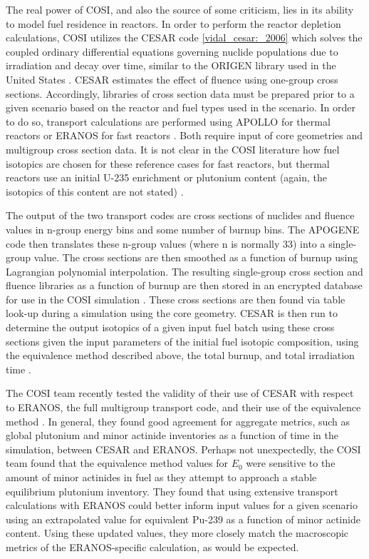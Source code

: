 The real power of COSI, and also the source of some criticism, lies in its
ability to model fuel residence in reactors. In order to perform the reactor
depletion calculations, COSI utilizes the CESAR code \ref{vidal_cesar:_2006}
which solves the coupled ordinary differential equations governing nuclide
populations due to irradiation and decay over time, similar to the ORIGEN
library used in the United States \cite{bell_origen_1973}. CESAR estimates the
effect of fluence using one-group cross sections. Accordingly, libraries of
cross section data must be prepared prior to a given scenario based on the
reactor and fuel types used in the scenario. In order to do so, transport
calculations are performed using APOLLO \cite{santamarina_2009_apollo2} for
thermal reactors or ERANOS for fast reactors \cite{ruggieri_2006_eranos}. Both
require input of core geometries and multigroup cross section data. It is not
clear in the COSI literature how fuel isotopics are chosen for these reference
cases for fast reactors, but thermal reactors use an initial U-235 enrichment or
plutonium content (again, the isotopics of this content are not
stated) \cite{guerin_benchmark_2009}.

The output of the two transport codes are cross sections of nuclides and fluence
values in n-group energy bins and some number of burnup bins. The APOGENE code
then translates these n-group values (where n is normally 33) into a
single-group value. The cross sections are then smoothed as a function of burnup
using Lagrangian polynomial interpolation. The resulting single-group cross
section and fluence libraries as a function of burnup are then stored in an
encrypted database for use in the COSI
simulation \cite{atabekjana_2012_analysis}. These cross sections are then found
via table look-up during a simulation using the core geometry. CESAR is then run
to determine the output isotopics of a given input fuel batch using these cross
sections given the input parameters of the initial fuel isotopic composition,
using the equivalence method described above, the total burnup, and total
irradiation time \cite{coquelet-pascal_validation_2011}. 

The COSI team recently tested the validity of their use of CESAR with respect to
ERANOS, the full multigroup transport code, and their use of the equivalence
method \cite{coquelet-pascal_validation_2011}. In general, they found good
agreement for aggregate metrics, such as global plutonium and minor actinide
inventories as a function of time in the simulation, between CESAR and
ERANOS. Perhaps not unexpectedly, the COSI team found that the equivalence
method values for $E_0$ were sensitive to the amount of minor actinides in fuel
as they attempt to approach a stable equilibrium plutonium inventory. They found
that using extensive transport calculations with ERANOS could better inform
input values for a given scenario using an extrapolated value for equivalent
Pu-239 as a function of minor actinide content. Using these updated values, they
more closely match the macroscopic metrics of the ERANOS-specific calculation,
as would be expected.
